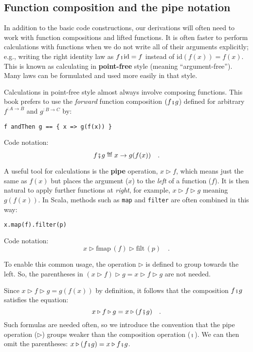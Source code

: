 \subsection{Function composition and the pipe notation}

In addition to the basic code constructions, our derivations will
often need to work with function compositions and lifted functions.
It is often faster to perform calculations with functions when we
do not write all of their arguments explicitly; e.g., writing the
right identity law as $f\bef\text{id}=f$ instead of $\text{id}\left(f(x)\right)=f(x)$.
This is known as calculating in \textbf{point-free}
style (meaning \textsf{``}argument-free\textsf{''}). Many laws can be formulated and
used more easily in that style. 

Calculations in point-free style almost always involve composing functions.
This book prefers to use the \emph{forward} function composition $(f\bef g$)
defined for arbitrary $f^{:A\rightarrow B}$ and $g^{:B\rightarrow C}$
by:
\begin{lstlisting}
f andThen g == { x => g(f(x)) }
\end{lstlisting}
Code notation:
\[
f\bef g\triangleq x\rightarrow g(f(x))\quad.
\]

A useful tool for calculations is the \textbf{pipe}
operation, $x\triangleright f$, which means just the same as $f(x)$
but places the argument ($x$) to the \emph{left} of a function ($f$).
It is then natural to apply further functions at \emph{right}, for
example, $x\triangleright f\triangleright g$ meaning $g(f(x))$.
In Scala, methods such as \lstinline!map! and \lstinline!filter!
are often combined in this way:
\begin{lstlisting}
x.map(f).filter(p)
\end{lstlisting}
Code notation:
\[
x\triangleright\text{fmap}\,(f)\triangleright\text{filt}\,(p)\quad.
\]

To enable this common usage, the operation $\triangleright$ is defined
to group towards the left. So, the parentheses in $(x\triangleright f)\triangleright g=x\triangleright f\triangleright g$
are not needed.

Since $x\triangleright f\triangleright g=g(f(x))$ by definition,
it follows that the composition $f\bef g$ satisfies the equation:
\[
x\triangleright f\triangleright g=x\triangleright(f\bef g)\quad.
\]
Such formulas are needed often, so we introduce the convention that
the pipe operation ($\triangleright$) groups weaker than the composition
operation ($\bef$). We
can then omit the parentheses: $x\triangleright(f\bef g)=x\triangleright f\bef g$. 

